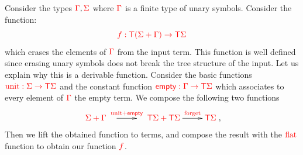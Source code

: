 \noindent\begin{example}[Filter]\label{ex:filter} Consider the types ${\color{red}{\Gamma}}, {\color{red}{\Sigma}}$  where ${\color{red}{\Gamma}}$ is a finite type of unary symbols. Consider the function:
$$ {\color{red}{f:{\color{red}{\mathsf T}}({\color{red}{\Sigma}}+{\color{red}{\Gamma}})\to{\color{red}{\mathsf T}}{\color{red}{\Sigma}}}}$$
which erases the elements of ${\color{red}{\Gamma}}$ from the input term. This function is well defined since erasing unary symbols does not break the tree structure of the input.
Let us explain why this is a derivable function.
Consider the basic functions ${\color{red}{{\color{red}{\mathrm{unit}}}:{\color{red}{\Sigma}}\to{\color{red}{\mathsf T}}{\color{red}{\Sigma}}}}$ and the constant function ${\color{red}{\mathsf{empty}:{\color{red}{\Gamma}}\to{\color{red}{\mathsf T}}{\color{red}{\Sigma}}}}$ which associates to every element of ${\color{red}{\Gamma}}$ the empty term. We compose the following two functions 
\begin{align*}
\xymatrix{
    \ranked{\rSigma+\rGamma}\quad \ar[r]^-{\ranked{\unit+\mathsf{empty}}} & \quad \ranked{\tmonad\rSigma+\tmonad\rSigma}\ar[r]^-{\ranked{\mathrm{forget}}} &\tmonad\rSigma
},
\end{align*}
Then we lift the obtained function to terms, and compose the result with the ${\color{red}{\mathrm{flat}}}$ function to obtain our function ${\color{red}{f}}$.  
\end{example}


